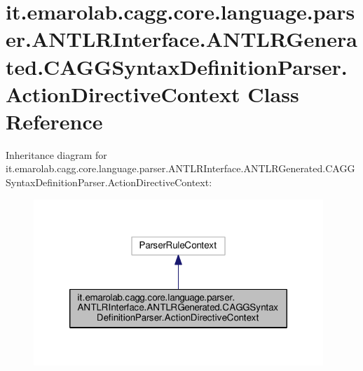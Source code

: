 \hypertarget{classit_1_1emarolab_1_1cagg_1_1core_1_1language_1_1parser_1_1ANTLRInterface_1_1ANTLRGenerated_1_02518070e6ba2b505060c86c83a44fb1}{\section{it.\-emarolab.\-cagg.\-core.\-language.\-parser.\-A\-N\-T\-L\-R\-Interface.\-A\-N\-T\-L\-R\-Generated.\-C\-A\-G\-G\-Syntax\-Definition\-Parser.\-Action\-Directive\-Context Class Reference}
\label{classit_1_1emarolab_1_1cagg_1_1core_1_1language_1_1parser_1_1ANTLRInterface_1_1ANTLRGenerated_1_02518070e6ba2b505060c86c83a44fb1}
}


Inheritance diagram for it.\-emarolab.\-cagg.\-core.\-language.\-parser.\-A\-N\-T\-L\-R\-Interface.\-A\-N\-T\-L\-R\-Generated.\-C\-A\-G\-G\-Syntax\-Definition\-Parser.\-Action\-Directive\-Context\-:
\nopagebreak
\begin{figure}[H]
\begin{center}
\leavevmode
\includegraphics[width=310pt]{classit_1_1emarolab_1_1cagg_1_1core_1_1language_1_1parser_1_1ANTLRInterface_1_1ANTLRGenerated_1_82af0544e49f48cc6e0a804a65649bc4}
\end{center}
\end{figure}


